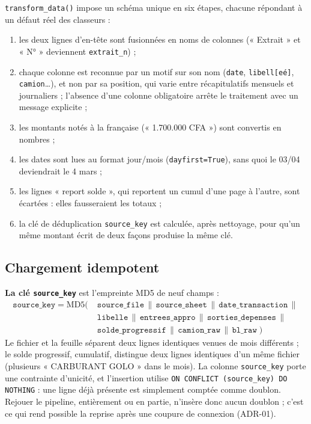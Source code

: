 \texttt{transform\_data()} impose un schéma unique en six étapes, chacune répondant à un défaut réel des classeurs :
\begin{enumerate}
    \item les deux lignes d'en-tête sont fusionnées en noms de colonnes (« Extrait » et « N° » deviennent \texttt{extrait\_n}) ;
    \item chaque colonne est reconnue par un motif sur son nom (\texttt{date}, \texttt{libell[eé]}, \texttt{camion}\ldots), et non par sa position, qui varie entre récapitulatifs mensuels et journaliers ; l'absence d'une colonne obligatoire arrête le traitement avec un message explicite ;
    \item les montants notés à la française (« 1.700.000 CFA ») sont convertis en nombres ;
    \item les dates sont lues au format jour/mois (\texttt{dayfirst=True}), sans quoi le 03/04 deviendrait le 4 mars ;
    \item les lignes « report solde », qui reportent un cumul d'une page à l'autre, sont écartées : elles fausseraient les totaux ;
    \item la clé de déduplication \texttt{source\_key} est calculée, après nettoyage, pour qu'un même montant écrit de deux façons produise la même clé.
\end{enumerate}

\subsection{Chargement idempotent}
\label{sec: chargement}

\textbf{La clé \texttt{source\_key}} est l'empreinte MD5 de neuf champs :
\[
\begin{aligned}
\texttt{source\_key} = \mathrm{MD5}\big(\;
  &\texttt{source\_file} \,\|\, \texttt{source\_sheet} \,\|\, \texttt{date\_transaction} \,\|\,{} \\
  &\texttt{libelle} \,\|\, \texttt{entrees\_appro} \,\|\, \texttt{sorties\_depenses} \,\|\,{} \\
  &\texttt{solde\_progressif} \,\|\, \texttt{camion\_raw} \,\|\, \texttt{bl\_raw}\;\big)
\end{aligned}
\]
Le fichier et la feuille séparent deux lignes identiques venues de mois différents ; le solde progressif, cumulatif, distingue deux lignes identiques d'un même fichier (plusieurs « CARBURANT GOLO » dans le mois). La colonne \texttt{source\_key} porte une contrainte d'unicité, et l'insertion utilise \texttt{ON CONFLICT (source\_key) DO NOTHING} : une ligne déjà présente est simplement comptée comme doublon. Rejouer le pipeline, entièrement ou en partie, n'insère donc aucun doublon ; c'est ce qui rend possible la reprise après une coupure de connexion (ADR-01).

